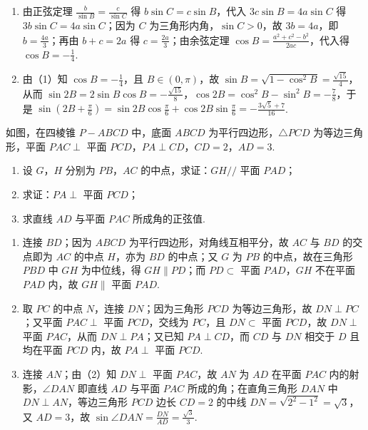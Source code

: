 \begin{solution}
\begin{enumerate}
\item 由正弦定理 \(\frac{b}{\sin B}=\frac{c}{\sin C}\) 得 \(b\sin C=c\sin B\)，代入 \(3c\sin B=4a\sin C\) 得 \(3b\sin C=4a\sin C\)；因为 \(C\) 为三角形内角，\(\sin C>0\)，故 \(3b=4a\)，即 \(b=\frac{4a}{3}\)；再由 \(b+c=2a\) 得 \(c=\frac{2a}{3}\)；由余弦定理 \(\cos B=\frac{a^{2}+c^{2}-b^{2}}{2ac}\)，代入得 \(\cos B=-\frac{1}{4}\).
\item 由（1）知 \(\cos B=-\frac{1}{4}\)，且 \(B\in\left(0,\pi\right)\)，故 \(\sin B=\sqrt{1-\cos^{2}B}=\frac{\sqrt{15}}{4}\)，从而 \(\sin 2B=2\sin B\cos B=-\frac{\sqrt{15}}{8}\)，\(\cos 2B=\cos^{2}B-\sin^{2}B=-\frac{7}{8}\)，于是 \(\sin\left(2B+\frac{\pi}{6}\right)=\sin 2B\cos\frac{\pi}{6}+\cos 2B\sin\frac{\pi}{6}=-\frac{3\sqrt{5}+7}{16}\).
\end{enumerate}
\end{solution}

\begin{problem}
如图，在四棱锥 \(P-ABCD\) 中，底面 \(ABCD\) 为平行四边形，\(\triangle PCD\) 为等边三角形，平面 \(PAC\perp\) 平面 \(PCD\)，\(PA\perp CD\)，\(CD=2\)，\(AD=3\).

\begin{enumerate}
\item 设 \(G\)，\(H\) 分别为 \(PB\)，\(AC\) 的中点，求证：\(GH//\) 平面 \(PAD\)；
\item 求证：\(PA\perp\) 平面 \(PCD\)；
\item 求直线 \(AD\) 与平面 \(PAC\) 所成角的正弦值.
\end{enumerate}

\end{problem}

\begin{solution}
\begin{enumerate}
\item 连接 \(BD\)；因为 \(ABCD\) 为平行四边形，对角线互相平分，故 \(AC\) 与 \(BD\) 的交点即为 \(AC\) 的中点 \(H\)，亦为 \(BD\) 的中点；又 \(G\) 为 \(PB\) 的中点，故在三角形 \(PBD\) 中 \(GH\) 为中位线，得 \(GH\parallel PD\)；而 \(PD\subset\) 平面 \(PAD\)，\(GH\) 不在平面 \(PAD\) 内，故 \(GH\parallel\) 平面 \(PAD\).
\item 取 \(PC\) 的中点 \(N\)，连接 \(DN\)；因为三角形 \(PCD\) 为等边三角形，故 \(DN\perp PC\)；又平面 \(PAC\perp\) 平面 \(PCD\)，交线为 \(PC\)，且 \(DN\subset\) 平面 \(PCD\)，故 \(DN\perp\) 平面 \(PAC\)，从而 \(DN\perp PA\)；又已知 \(PA\perp CD\)，而 \(CD\) 与 \(DN\) 相交于 \(D\) 且均在平面 \(PCD\) 内，故 \(PA\perp\) 平面 \(PCD\).
\item 连接 \(AN\)；由（2）知 \(DN\perp\) 平面 \(PAC\)，故 \(AN\) 为 \(AD\) 在平面 \(PAC\) 内的射影，\(\angle DAN\) 即直线 \(AD\) 与平面 \(PAC\) 所成的角；在直角三角形 \(DAN\) 中 \(DN\perp AN\)，等边三角形 \(PCD\) 边长 \(CD=2\) 的中线 \(DN=\sqrt{2^{2}-1^{2}}=\sqrt{3}\)，又 \(AD=3\)，故 \(\sin\angle DAN=\frac{DN}{AD}=\frac{\sqrt{3}}{3}\).
\end{enumerate}
\end{solution}

